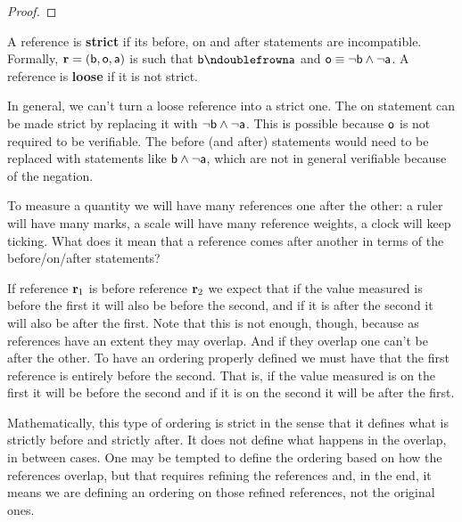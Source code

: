 \documentclass[11pt,letterpaper,fleqn]{memoir} %
\begin{document}
\begin{mathSection}
\begin{proof}
\end{proof}
\begin{defn}
	A reference is \textbf{strict} if its before, on and after statements are incompatible. Formally, $\refStmt = (\stmt[b], \stmt[o], \stmt[a])$ is such that $\stmt[b] \ncomp \stmt[a]$ and $\stmt[o] \equiv \NOT \stmt[b] \AND \NOT \stmt[a]$. A reference is \textbf{loose} if it is not strict.
\end{defn}
\begin{remark}
	In general, we can't turn a loose reference into a strict one. The on statement can be made strict by replacing it with $\NOT \stmt[b] \AND \NOT \stmt[a]$. This is possible because $\stmt[o]$ is not required to be verifiable. The before (and after) statements would need to be replaced with statements like $\stmt[b] \AND \NOT \stmt[a]$, which are not in general verifiable because of the negation.
\end{remark}
\end{mathSection}

To measure a quantity we will have many references one after the other: a ruler will have many marks, a scale will have many reference weights, a clock will keep ticking. What does it mean that a reference comes after another in terms of the before/on/after statements?

If reference $\refStmt_1$ is before reference $\refStmt_2$ we expect that if the value measured is before the first it will also be before the second, and if it is after the second it will also be after the first. Note that this is not enough, though, because as references have an extent they may overlap. And if they overlap one can't be after the other. To have an ordering properly defined we must have that the first reference is entirely before the second. That is, if the value measured is on the first it will be before the second and if it is on the second it will be after the first.

Mathematically, this type of ordering is strict in the sense that it defines what is strictly before and strictly after. It does not define what happens in the overlap, in between cases. One may be tempted to define the ordering based on how the references overlap, but that requires refining the references and, in the end, it means we are defining an ordering on those refined references, not the original ones.
\end{document}
